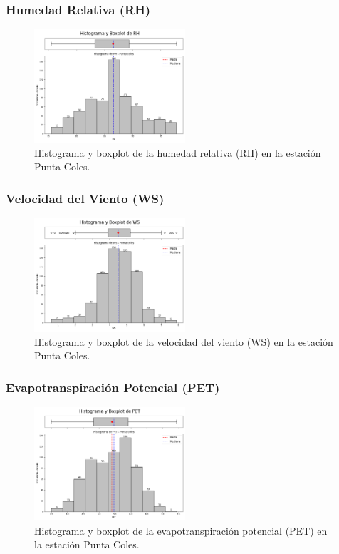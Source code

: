 \subsubsection*{Humedad Relativa (RH)}
\begin{figure}[H]
\centering
\includegraphics[width=0.5\textwidth]{resultados/por_estacion_meteorologica/Punta_Coles/RH_histograma.png}
\caption{Histograma y boxplot de la humedad relativa (RH) en la estación Punta Coles.}
\label{fig:punta_coles_RH}
\end{figure}

\subsubsection*{Velocidad del Viento (WS)}
\begin{figure}[H]
\centering
\includegraphics[width=0.5\textwidth]{resultados/por_estacion_meteorologica/Punta_Coles/WS_histograma.png}
\caption{Histograma y boxplot de la velocidad del viento (WS) en la estación Punta Coles.}
\label{fig:punta_coles_WS}
\end{figure}

\subsubsection*{Evapotranspiración Potencial (PET)}
\begin{figure}[H]
\centering
\includegraphics[width=0.5\textwidth]{resultados/por_estacion_meteorologica/Punta_Coles/PET_histograma.png}
\caption{Histograma y boxplot de la evapotranspiración potencial (PET) en la estación Punta Coles.}
\label{fig:punta_coles_PET}
\end{figure}

